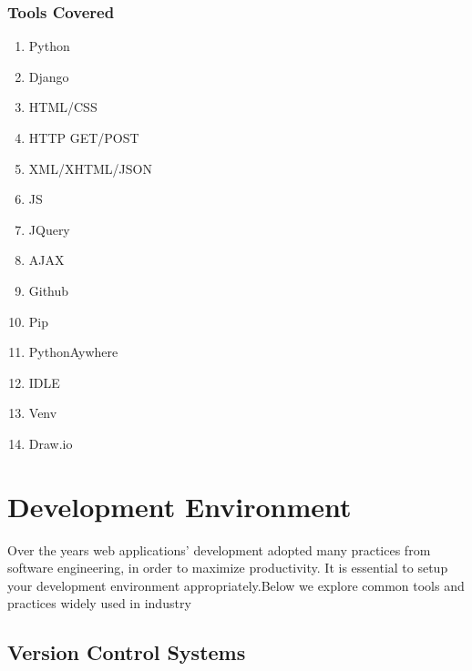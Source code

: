 


\subsubsection{Tools Covered}

		\begin{multicols}{2}
				\begin{enumerate}
					\item Python
					\item Django
					\item HTML/CSS
					\item HTTP GET/POST
					\item XML/XHTML/JSON
					\item JS
					\item JQuery
					\item AJAX
					\item Github
					\item Pip
					\item PythonAywhere
					\item IDLE
					\item Venv
					\item Draw.io
				\end{enumerate}
		\end{multicols}

	\section{Development Environment}


	\par{Over the years web applications' development adopted many practices
			from software engineering, in order to maximize productivity. It is
			essential to setup your development environment appropriately.Below
			we explore common tools and practices widely used in industry}

	\subsection{Version Control Systems}


